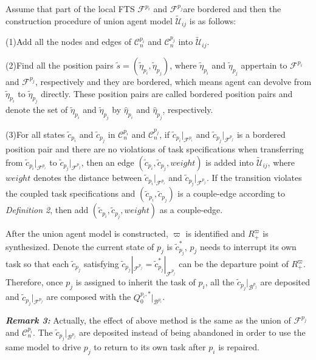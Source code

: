 \documentclass[journal]{IEEEtran}
\begin{document}
Assume that part of the local FTS $\mathcal{F}^{p_i}$ and $\mathcal{F}^{p_j}$are bordered and then the construction procedure of union agent model $\widetilde{\mathcal{U}}_{ij}$ is as follows:\par
(1)Add all the nodes and edges of $\mathcal{C}^{p_i}_n$ and $\mathcal{C}^{p_j}_n$ into $\widetilde{\mathcal{U}}_{ij}$.\par
(2)Find all the position pairs $\tilde{s}=(\tilde{\eta}_{p_i},\tilde{\eta}_{p_j})$, where $\tilde{\eta}_{p_i}$ and $\tilde{\eta}_{p_j}$ appertain to $\mathcal{F}^{p_i}$ and $\mathcal{F}^{p_j}$, respectively and they are bordered, which means agent can devolve from $\tilde{\eta}_{p_i}$ to $\tilde{\eta}_{p_j}$ directly. These position pairs are called bordered position pairs and denote the set of $\tilde{\eta}_{p_i}$ and $\tilde{\eta}_{p_j}$ by $\hat{\eta}_{p_i}$ and $\hat{\eta}_{p_j}$, respectively.\par
(3)For all states $\tilde{c}_{p_i}$ and $\tilde{c}_{p_j}$ in $\mathcal{C}^{p_i}_n$ and $\mathcal{C}^{p_j}_n$, if $\tilde{c}_{p_i}|_{\mathcal{F}^{p_i}}$ and $\tilde{c}_{p_j}|_{\mathcal{F}^{p_j}}$ is a bordered position pair and there are no violations of task specifications when transferring from $\tilde{c}_{p_i}|_{\mathcal{F}^{p_i}}$ to $\tilde{c}_{p_j}|_{\mathcal{F}^{p_j}}$, then an edge $(\tilde{c}_{p_i},\tilde{c}_{p_j},weight)$ is added into $\widetilde{\mathcal{U}}_{ij}$, where $weight$ denotes the distance between $\tilde{c}_{p_i}|_{\mathcal{F}^{p_i}}$ and $\tilde{c}_{p_j}|_{\mathcal{F}^{p_j}}$. If the transition violates the coupled task specifications and $(\tilde{c}_{p_i},\tilde{c}_{p_j})$ is a couple-edge according to \emph{Definition 2}, then add $(\tilde{c}_{p_i},\tilde{c}_{p_j},weight)$ as a couple-edge.\par
After the union agent model is constructed, $\varpi$ is identified and $R^{\varpi}_+$ is synthesized. Denote the current state of $p_j$ is $\tilde{c}_{p_j}^{\ast}$, $p_j$ needs to interrupt its own task so that each $\tilde{c}_{p_j}$ satisfying $\tilde{c}_{p_j}|_{\mathcal{F}^{p_j}}=\tilde{c}_{p_j}^{\ast}|_{\mathcal{F}^{p_j}}$ can be the departure point of $R^{\varpi}_+$. Therefore, once $p_j$ is assigned to inherit the task of $p_i$, all the $\tilde{c}_{p_j}|_{\mathcal{B}^{p_j}}$ are deposited and $\tilde{c}_{p_j}|_{\mathcal{F}^{p_j}}$ are composed with the $Q^{p_i,\ast}_0|_{\mathcal{B}^{p_i}}$.

\textbf{\emph{Remark 3:}} Actually, the effect of above method is the same as the union of $\mathcal{F}^{p_j}$ and $\mathcal{C}^{p_i}_n$. The $\tilde{c}_{p_j}|_{\mathcal{B}^{p_j}}$ are deposited instead of being abandoned in order to use the same model to drive $p_j$ to return to its own task after $p_i$ is repaired.
\end{document}
